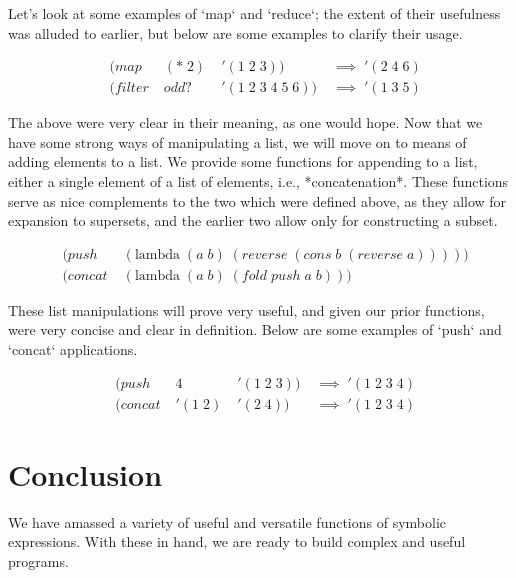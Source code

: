 Let's look at some examples of `map` and `reduce`; the extent of their usefulness 
was alluded to earlier, but below are some examples to clarify their usage.

\begin{align*}
& (map \; &(* \; 2) \; &'(1 \; 2 \; 3)) \; &\implies \; '(2 \; 4 \; 6)
\\& (filter \; &odd? \; &'(1 \; 2 \; 3 \; 4 \; 5 \; 6)) \; &\implies \; '(1 \; 3 \; 5)
\end{align*}

The above were very clear in their meaning, as one would hope. Now that we have 
some strong ways of manipulating a list, we will move on to means of adding 
elements to a list. We provide some functions for appending to a list, either a 
single element of a list of elements, i.e., *concatenation*. These functions serve 
as nice complements to the two which were defined above, as they allow for 
expansion to supersets, and the earlier two allow only for constructing a subset.

\begin{align*}
& (push \; &(\text{lambda} \; (a \; b) \; (reverse \; (cons \; b \; (reverse \; a)))))
\\& (concat \; &(\text{lambda} \; (a \; b) \; (fold \; push \; a \; b)))
\end{align*}

These list manipulations will prove very useful, and given our prior functions, 
were very concise and clear in definition. Below are some examples of `push` and 
`concat` applications.

\begin{align*}
& (push \; &4 \; &'(1 \; 2 \; 3)) \; &\implies \; '(1 \; 2 \; 3 \; 4)
\\& (concat \; &'(1 \; 2) \; &'(2 \; 4)) \; &\implies \; '(1 \; 2 \; 3 \; 4)
\end{align*}

\section{Conclusion}
We have amassed a variety of useful and versatile functions of symbolic 
expressions. With these in hand, we are ready to build complex and useful 
programs.
